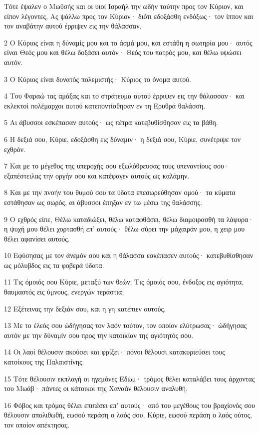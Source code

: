 \par Τότε έψαλεν ο Μωϋσής και οι υιοί Ισραήλ την ωδήν ταύτην προς τον Κύριον, και είπον λέγοντες, Ας ψάλλω προς τον Κύριον· διότι εδοξάσθη ενδόξως· τον ίππον και τον αναβάτην αυτού έρριψεν εις την θάλασσαν.
\par 2 Ο Κύριος είναι η δύναμίς μου και το άσμά μου, και εστάθη η σωτηρία μου· αυτός είναι Θεός μου και θέλω δοξάσει αυτόν· Θεός του πατρός μου, και θέλω υψώσει αυτόν.
\par 3 Ο Κύριος είναι δυνατός πολεμιστής· Κύριος το όνομα αυτού.
\par 4 Του Φαραώ τας αμάξας και το στράτευμα αυτού έρριψεν εις την θάλασσαν· και εκλεκτοί πολέμαρχοι αυτού κατεποντίσθησαν εν τη Ερυθρά θαλάσση.
\par 5 Αι άβυσσοι εσκέπασαν αυτούς· ως πέτρα κατεβυθίσθησαν εις τα βάθη.
\par 6 Η δεξιά σου, Κύριε, εδοξάσθη εις δύναμιν· η δεξιά σου, Κύριε, συνέτριψε τον εχθρόν.
\par 7 Και με το μέγεθος της υπεροχής σου εξωλόθρευσας τους υπεναντίους σου· εξαπέστειλας την οργήν σου και κατέφαγεν αυτούς ως καλάμην.
\par 8 Και με την πνοήν του θυμού σου τα ύδατα επεσωρεύθησαν ομού· τα κύματα εστάθησαν ως σωρός, αι άβυσσοι έπηξαν εν τω μέσω της θαλάσσης.
\par 9 Ο εχθρός είπε, Θέλω καταδιώξει, θέλω καταφθάσει, θέλω διαμοιρασθή τα λάφυρα· η ψυχή μου θέλει χορτασθή επ' αυτούς· θέλω σύρει την μάχαιράν μου, η χειρ μου θέλει αφανίσει αυτούς.
\par 10 Εφύσησας με τον άνεμόν σου και η θάλασσα εσκέπασεν αυτούς· κατεβυθίσθησαν ως μόλυβδος εις τα φοβερά ύδατα.
\par 11 Τις όμοιός σου Κύριε, μεταξύ των θεών; Τις όμοιός σου, ένδοξος εις αγιότητα, θαυμαστός εις ύμνους, ενεργών τεράστια;
\par 12 Εξέτεινας την δεξιάν σου, και η γη κατέπιεν αυτούς.
\par 13 Με το έλεός σου ώδήγησας τον λαόν τούτον, τον οποίον ελύτρωσας· ώδήγησας αυτόν με την δύναμίν σου προς την κατοικίαν της αγιότητός σου.
\par 14 Οι λαοί θέλουσιν ακούσει και φρίξει· πόνοι θέλουσι κατακυριεύσει τους κατοίκους της Παλαιστίνης.
\par 15 Τότε θέλουσιν εκπλαγή οι ηγεμόνες Εδώμ· τρόμος θέλει καταλάβει τους άρχοντας του Μωάβ· πάντες οι κάτοικοι της Χαναάν θέλουσιν αναλυθή.
\par 16 Φόβος και τρόμος θέλει επιπέσει επ' αυτούς· από του μεγέθους του βραχίονός σου θέλουσιν απολιθωθή, εωσού περάση ο λαός σου, Κύριε, εωσού περάση ο λαός ούτος, τον οποίον απέκτησας.
